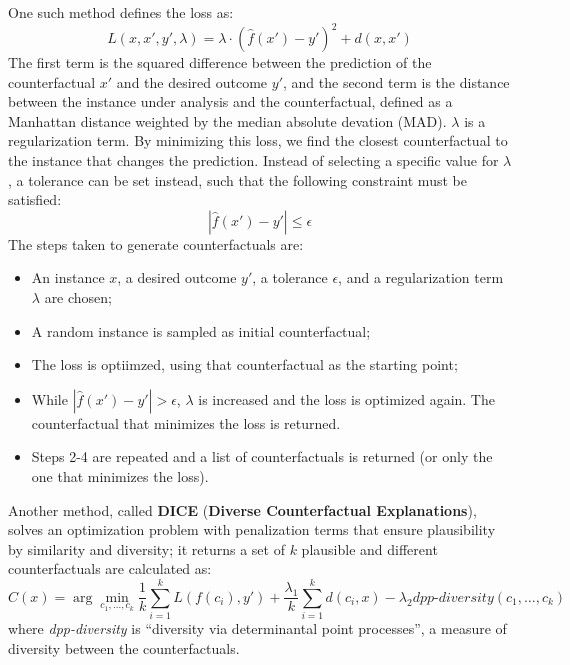 One such method defines the loss as:
\begin{equation*}
    L(x,x',y',\lambda) = \lambda \cdot (\hat{f}(x') - y')^2 + d(x,x')
\end{equation*}
The first term is the squared difference between the prediction of the counterfactual $x'$ and the desired outcome $y'$, and the second term is the distance between the instance under analysis and the counterfactual, defined as a Manhattan distance weighted by the median absolute devation (MAD). $\lambda$ is a regularization term. By minimizing this loss, we find the closest counterfactual to the instance that changes the prediction. Instead of selecting a specific value for $\lambda$, a tolerance can be set instead, such that the following constraint must be satisfied:
\begin{equation*}
    |\hat{f}(x') - y'| \leq \epsilon
\end{equation*}
The steps taken to generate counterfactuals are:
\begin{itemize}
    \item An instance $x$, a desired outcome $y'$, a tolerance $\epsilon$, and a regularization term $\lambda$ are chosen;
    \item A random instance is sampled as initial counterfactual;
    \item The loss is optiimzed, using that counterfactual as the starting point;
    \item While $|\hat{f}(x') - y'| > \epsilon$, $\lambda$ is increased and the loss is optimized again. The counterfactual that minimizes the loss is returned.
    \item Steps 2-4 are repeated and a list of counterfactuals is returned (or only the one that minimizes the loss).
\end{itemize}

Another method, called \textbf{DICE} (\textbf{Diverse Counterfactual Explanations}), solves an optimization problem with penalization terms that ensure plausibility by similarity and diversity; it returns a set of $k$ plausible and different counterfactuals are calculated as:
\begin{equation*}
    C(x) = \arg \min_{c_1, \dots, c_k} \dfrac{1}{k} \sum_{i=1}^k L(f(c_i), y') + \dfrac{\lambda_1}{k} \sum_{i=1}^k d(c_i, x) - \lambda_2 \textit{dpp-diversity}(c_1, \dots, c_k)
\end{equation*}
where \textit{dpp-diversity} is ``diversity via determinantal point processes'', a measure of diversity between the counterfactuals. 

